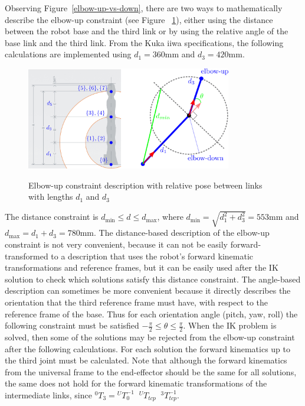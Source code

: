 Observing Figure~\ref{elbow-up-vs-down}, there are two ways to mathematically describe the elbow-up constraint (see Figure~ \ref{elbow-up-constraint-geometry}), either using the distance between the robot base and the third link or by using the relative angle of the base link and the third link. From the Kuka iiwa specifications, the following calculations are implemented using $d_1 = 360$mm and $d_3 = 420$mm.

\begin{figure}[htbp]
\centering
\includegraphics[width=0.8\textwidth]{images/elbow-up-constraint-geometry.png}\\
\caption{Elbow-up constraint description with relative pose between links with lengths $d_1$ and $d_3$}
\label{elbow-up-constraint-geometry}
\end{figure}

The distance constraint is $d_{\min} \leq d \leq d_{\max}$,
where
$d_{\min} = \sqrt{d_1^2 + d_3^2} = 553$mm and $d_{\max} = d_1 + d_3 = 780\mbox{mm}.
$
The distance-based description of the elbow-up constraint is not very convenient, because it can not be easily forward-transformed to a description that uses the robot's forward kinematic transformations and reference frames, but it can be easily used after the IK solution to check which solutions satisfy this distance constraint. The angle-based description can sometimes be more convenient because it directly describes the orientation that the third reference frame must have, with respect to the reference frame of the base. Thus for each orientation angle (pitch, yaw, roll) the following constraint must be satisfied 
$-\frac{\pi}{2} \leq θ \leq \frac{\pi}{2}$.
When the IK problem is solved, then some of the solutions may be rejected from the elbow-up constraint after the following calculations. For each solution the forward kinematics up to the third joint must be 
calculated. Note that although the forward kinematics from the universal frame to the end-effector should be the same for all solutions, the same does not hold for the forward kinematic transformations of the intermediate links, since 
$
{}^0T_3 = {}^UT_0^{-1}  \;\;  {}^UT_{tcp}  \;\;   {}^3T_{tcp}^{-1}
$.

